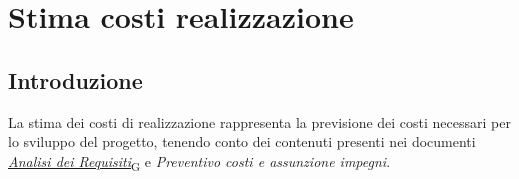 
\section{Stima costi realizzazione}
\subsection{Introduzione}
La stima dei costi di realizzazione rappresenta la previsione dei costi necessari per lo sviluppo del progetto, tenendo conto dei contenuti presenti nei documenti \href{https://7last.github.io/docs/pb/documentazione-interna/glossario\#analisi-dei-requisiti}{\textit{Analisi dei Requisiti}\textsubscript{G}} e \textit{Preventivo costi e assunzione impegni}.
